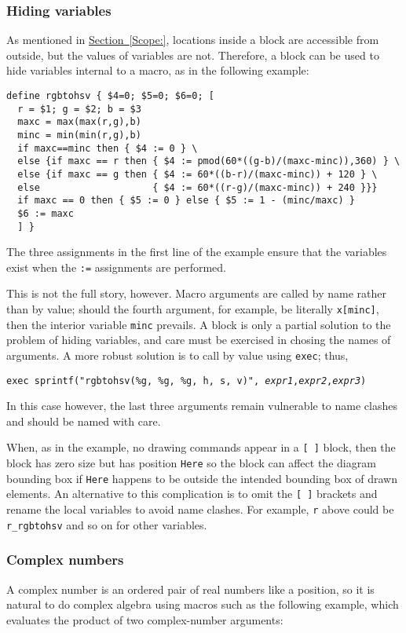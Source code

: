 \documentclass[11pt]{article}
\newcommand{\ntt}[1]{\\\hbox{}\quad{\tt #1}}
\newcommand{\SR}[1]{\hyperref[#1]{Section~\ref*{#1}}}
\begin{document}
\subsubsection{Hiding variables}
As mentioned in \SR{Scope:}, locations inside a block are accessible
from outside, but the values of variables are not.  Therefore, a block
can be used to hide variables internal to a macro, as in the following example:
\begin{verbatim}
define rgbtohsv { $4=0; $5=0; $6=0; [
  r = $1; g = $2; b = $3
  maxc = max(max(r,g),b)
  minc = min(min(r,g),b)
  if maxc==minc then { $4 := 0 } \
  else {if maxc == r then { $4 := pmod(60*((g-b)/(maxc-minc)),360) } \
  else {if maxc == g then { $4 := 60*((b-r)/(maxc-minc)) + 120 } \
  else                    { $4 := 60*((r-g)/(maxc-minc)) + 240 }}}
  if maxc == 0 then { $5 := 0 } else { $5 := 1 - (minc/maxc) }
  $6 := maxc
  ] }
\end{verbatim}
The three assignments in the first line of the example
ensure that the variables exist when the {\tt :=} assignments
are performed.

This is not the full story, however. Macro arguments are called by name
rather than by value; should the fourth argument, for example, be
literally {\tt x[minc]}, then the interior variable {\tt minc} prevails.
A block is only a partial solution to the problem of hiding variables, and
care must be exercised in chosing the names of arguments.
A more robust solution is to call by value using {\tt exec}; thus,

{\tt exec sprintf("rgbtohsv(\%g, \%g, \%g, h, s, v)",%
{\sl expr1},{\sl expr2},{\sl expr3})}

In this case however, the last three arguments remain vulnerable to
name clashes and should be named with care.

When, as in the example, no drawing commands appear in a {\tt [ ]}
block, then the block has zero size but has position {\tt Here} so the
block can affect the diagram bounding box if {\tt Here} happens to be
outside the intended bounding box of drawn elements. An alternative
to this complication is to omit the {\tt [ ]} brackets and rename the
local variables to avoid name clashes. For example, {\tt r} above could
be {\tt r\_rgbtohsv} and so on for other variables.

\subsubsection{Complex numbers}
A complex number is an ordered pair of real numbers like a
position, so it is natural to do complex algebra using macros such as
the following example, which evaluates the
product of two complex-number arguments:
\ntt{%
  define Zprod \{ ( \$1.x*\$2.x - \$1.y*\$2.y, \$1.y*\$2.x + \$1.x*\$2.y ) \} }
\end{document}
